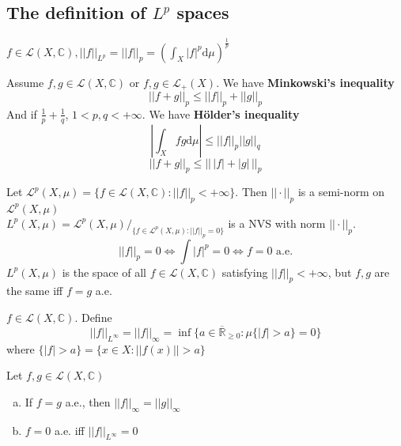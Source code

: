 \subsection{The definition of  $ L^p $  spaces}
\begin{definition}
     $ f\in \mathcal{L} (X,\mathbb{C}),||f||_{L^p}=||f||_p=(\int_X|f|^p\mathrm{d}\mu)^{\frac{1}{p}} $ 
\end{definition}
\begin{theorem}
    Assume  $ f,g\in\mathcal{L}(X,\mathbb{C}) $ or  $ f,g\in \mathcal{L}_+(X) $. We have \textbf{Minkowski's inequality}   \[ ||f+g||_p \leq||f||_p+||g||_p \]  
    And if $ \frac{1 }{p }+\frac{1}{q} $,  $ 1<p,q<+\infty $. We have \textbf{H{\"o}lder's inequality}
    \[|\int_X fg\mathrm{d}\mu| \leq||f||_p||g||_q\]
    \[||f+g||_p \leq||\,|f|+|g|\,||_p\]
\end{theorem}
\begin{definition}
    Let  $ \mathcal{L}^p(X,\mu)=\{f\in \mathcal{L}(X,\mathbb{C}):||f||_p<+\infty\} $. Then  $ ||\cdot||_p  $ is a semi-norm on  $ \mathcal{L}^p(X,\mu) $  \\
     $ L^p(X,\mu)=\mathcal{L}^p(X,\mu)/_{\{f\in \mathcal{L}^p(X,\mu):||f||_p=0\}} $  is a NVS with norm  $ ||\cdot||_p $.
     \[||f||_p=0\Leftrightarrow \int |f|^p=0\Leftrightarrow f=0 \text{ a.e.}\] 
      $ L^p(X,\mu ) $ is the space of all  $ f\in \mathcal{L}(X,\mathbb{C}) $ satisfying  $ ||f||_p<+\infty $, but  $ f,g  $ are the same iff  $ f=g  $ a.e.  
\end{definition}
\begin{definition}
     $ f\in \mathcal{L}(X,\mathbb{C}) $. Define
     \[||f||_{L^{\infty}}=||f||_\infty=\inf \{a\in \overline{\mathbb{R}}_{ \geq 0}:\mu\{|f|>a\}=0\}\]
     where  $ \{|f|>a\} =\{x\in X:||f(x)||>a\}$  
\end{definition}
\begin{proposition}
    Let  $ f,g\in \mathcal{L}(X,\mathbb{C}) $
    \begin{enumerate}[(a)]
        \item If  $ f=g  $ a.e., then  $ ||f||_\infty=||g||_\infty $ 
        \item  $ f=0  $ a.e. iff  $ ||f||_{L^\infty}=0 $ 
    \end{enumerate} 
\end{proposition}
